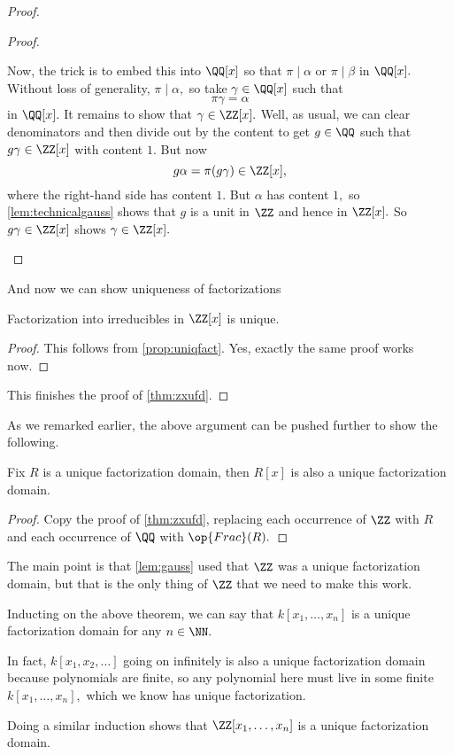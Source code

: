 \documentclass[../notes.tex]{subfiles}
\begin{document}
\begin{proof}
\begin{proof}
\begin{itemize}
			Now, the trick is to embed this into $\QQ[x]$ so that $\pi\mid\alpha$ or $\pi\mid\beta$ in $\QQ[x].$ Without loss of generality, $\pi\mid\alpha,$ so take $\gamma\in\QQ[x]$ such that
			\[\pi\gamma=\alpha\]
			in $\QQ[x].$ It remains to show that $\gamma\in\ZZ[x].$ Well, as usual, we can clear denominators and then divide out by the content to get $g\in\QQ$ such that $g\gamma\in\ZZ[x]$ with content $1.$ But now
			\[g\alpha=\pi(g\gamma)\in\ZZ[x],\]
			where the right-hand side has content $1.$ But $\alpha$ has content $1,$ so \autoref{lem:technicalgauss} shows that $g$ is a unit in $\ZZ$ and hence in $\ZZ[x].$ So $g\gamma\in\ZZ[x]$ shows $\gamma\in\ZZ[x].$
			\qedhere
		\end{itemize}
	\end{proof}
	And now we can show uniqueness of factorizations
	\begin{lemma}
		Factorization into irreducibles in $\ZZ[x]$ is unique.
	\end{lemma}
	\begin{proof}
		This follows from \autoref{prop:uniqfact}. Yes, exactly the same proof works now.
	\end{proof}
	This finishes the proof of \autoref{thm:zxufd}.
\end{proof}
As we remarked earlier, the above argument can be pushed further to show the following.
\begin{theorem}
	Fix $R$ is a unique factorization domain, then $R[x]$ is also a unique factorization domain.
\end{theorem}
\begin{proof}
	Copy the proof of \autoref{thm:zxufd}, replacing each occurrence of $\ZZ$ with $R$ and each occurrence of $\QQ$ with $\op{Frac}(R).$
\end{proof}
The main point is that \autoref{lem:gauss} used that $\ZZ$ was a unique factorization domain, but that is the only thing of $\ZZ$ that we need to make this work.
\begin{example}
	Inducting on the above theorem, we can say that $k[x_1,\ldots,x_n]$ is a unique factorization domain for any $n\in\NN.$
\end{example}
\begin{example}
	In fact, $k[x_1,x_2,\ldots]$ going on infinitely is also a unique factorization domain because polynomials are finite, so any polynomial here must live in some finite $k[x_1,\ldots,x_n],$ which we know has unique factorization.
\end{example}
\begin{example}
	Doing a similar induction shows that $\ZZ[x_1,\ldots,x_n]$ is a unique factorization domain.
\end{example}
\end{document}
